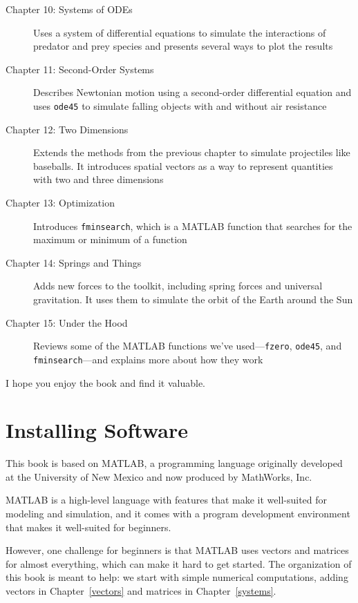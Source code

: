 \begin{description}
\item [Chapter 10: Systems of ODEs] Uses a system of differential equations to simulate the interactions of predator and prey species and presents several ways to plot the results

\item [Chapter 11: Second-Order Systems] Describes Newtonian motion using a second-order differential equation and uses \lstinline{ode45} to simulate falling objects with and without air resistance

\item [Chapter 12: Two Dimensions] Extends the methods from the previous chapter to simulate projectiles like baseballs.  It introduces spatial vectors as a way to represent quantities with two and three dimensions

\item [Chapter 13: Optimization] Introduces \lstinline{fminsearch}, which is a MATLAB function that searches for the maximum or minimum of a function

\item [Chapter 14: Springs and Things] Adds new forces to the toolkit, including spring forces and universal gravitation.  It uses them to simulate the orbit of the Earth around the Sun

\item [Chapter 15: Under the Hood] Reviews some of the MATLAB functions we've used---\lstinline{fzero}, \lstinline{ode45}, and \lstinline{fminsearch}---and explains more about how they work

\end{description}

I hope you enjoy the book and find it valuable.


\section{Installing Software}

This book is based on MATLAB, a programming language originally developed at the University of New Mexico and now produced by MathWorks, Inc.

MATLAB is a high-level language with features that make it well-suited for modeling and simulation, and it comes with a program development environment that makes it well-suited for beginners.

However, one challenge for beginners is that MATLAB uses vectors and matrices for almost everything, which can make it hard to get started.  The organization of this book is meant to help: we start with simple numerical computations, adding vectors in Chapter~\ref{vectors} and matrices in Chapter~\ref{systems}.

